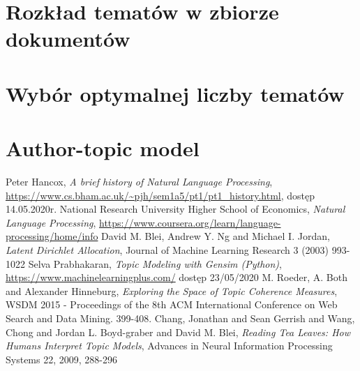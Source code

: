 \documentclass[a4paper,11pt,twoside]{report}
\theoremstyle{definition}
\begin{document}
\section{Rozkład tematów w zbiorze dokumentów}\label{section:ldavis}




\section{Wybór optymalnej liczby tematów}
\section{Author-topic model}




\begin{thebibliography}{25}%
 Peter Hancox, \textit{A brief history of Natural Language Processing}, \url{https://www.cs.bham.ac.uk/~pjh/sem1a5/pt1/pt1_history.html}, dostęp 14.05.2020r.
 National Research University Higher School of Economics, \textit{Natural Language Processing}, \url{https://www.coursera.org/learn/language-processing/home/info}
 David M. Blei, Andrew Y. Ng and Michael I. Jordan, \textit{Latent Dirichlet Allocation}, Journal of Machine Learning Research 3 (2003) 993-1022
 Selva Prabhakaran, \textit{Topic Modeling with Gensim (Python)}, \url{https://www.machinelearningplus.com/} dostęp 23/05/2020
 M. Roeder, A. Both and Alexander Hinneburg, \textit{Exploring the Space of Topic Coherence Measures}, WSDM 2015 - Proceedings of the 8th ACM International Conference on Web Search and Data Mining. 399-408.
 Chang, Jonathan and Sean Gerrish and Wang, Chong and Jordan L. Boyd-graber and David M. Blei, \textit{Reading Tea Leaves: How Humans Interpret Topic Models}, Advances in Neural Information Processing Systems 22, 2009, 288-296

\end{thebibliography}
\end{document}
